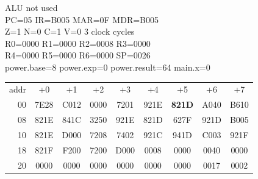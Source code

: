 \begin{tcolorbox}[stepbox, title={Step 31 \hfill PC 0F \quad JMP power.while1}]
\textcolor{dim}{ALU} \textcolor{dim}{not used}\\
PC=05 IR=B005 MAR=0F MDR=B005\\
Z=1 N=0 C=1 V=0 \hfill \textcolor{dim}{3 clock cycles}\\
R0=0000 R1=0000 R2=0008 R3=0000\\
R4=0000 R5=0000 R6=0000 SP=0026\\
\textcolor{dim}{power.base=8  power.exp=0  power.result=64  main.x=0}\\[1pt]
{\setlength{\tabcolsep}{1.6pt}\begin{tabular}{@{}r*{8}{c}@{}}
\textcolor{dim}{addr} & \textcolor{dim}{+0} & \textcolor{dim}{+1} & \textcolor{dim}{+2} & \textcolor{dim}{+3} & \textcolor{dim}{+4} & \textcolor{dim}{+5} & \textcolor{dim}{+6} & \textcolor{dim}{+7}\\
\textcolor{dim}{00} & 7E28 & C012 & 0000 & 7201 & 921E & \cellcolor{pcc}\textbf{821D} & A040 & B610\\
\textcolor{dim}{08} & 821E & 841C & 3250 & 921E & 821D & 627F & 921D & B005\\
\textcolor{dim}{10} & 821E & D000 & 7208 & 7402 & 921C & 941D & C003 & 921F\\
\textcolor{dim}{18} & 821F & F200 & 7200 & D000 & \cellcolor{datac}0008 & \cellcolor{datac}0000 & \cellcolor{datac}0040 & \cellcolor{datac}0000\\
\textcolor{dim}{20} & \cellcolor{stackc}0000 & \cellcolor{stackc}0000 & \cellcolor{stackc}0000 & \cellcolor{stackc}0000 & \cellcolor{stackc}0000 & \cellcolor{stackc}0000 & \cellcolor{stackc}0017 & \cellcolor{stackc}0002\\
\end{tabular}}
\end{tcolorbox}\par\vspace{3pt}
